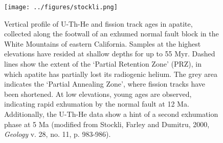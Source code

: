 \begin{figure}[!ht]
  \centering
  \ifpdf
  \ifuclnotes
  \def\svgwidth{.9\textwidth}
  \else
  \def\svgwidth{.7\textwidth}
  \fi
  
  \else
  \texttt{[image: ../figures/stockli.png]}
  \fi
  \caption{Vertical profile of U-Th-He and fission track ages in
    apatite, collected along the footwall of an exhumed normal fault
    block in the White Mountains of eastern California. Samples at the
    highest elevations have resided at shallow depths for up to 55
    Myr. Dashed lines show the extent of the `Partial Retention Zone'
    (PRZ), in which apatite has partially lost its radiogenic
    helium. The grey area indicates the `Partial Annealing Zone',
    where fission tracks have been shortened. At low elevations, young
    ages are observed, indicating rapid exhumation by the normal fault
    at 12 Ma. Additionally, the U-Th-He data show a hint of a second
    exhumation phase at 5 Ma (modified from Stockli, Farley and
    Dumitru, 2000, \textit{Geology} v. 28, no. 11, p. 983-986).}
  \label{fig:stockli}
\end{figure}
